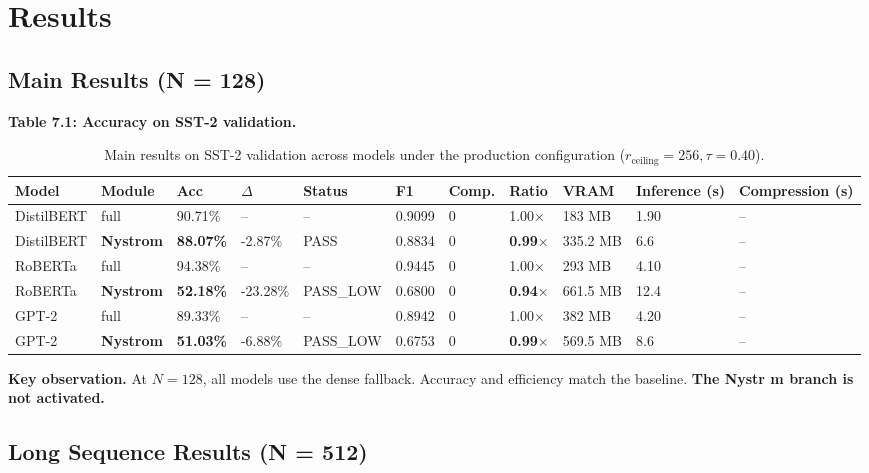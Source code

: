 
\section{Results}

\subsection{Main Results (N = 128)}

\textbf{Table 7.1: Accuracy on SST-2 validation.}

\begin{table}[t]
\centering
\small
\begin{tabular}{lllllllllll}
\toprule
\textbf{Model} & \textbf{Module} & \textbf{Acc} & \textbf{$\Delta$} & \textbf{Status} & \textbf{F1} & \textbf{Comp.} & \textbf{Ratio} & \textbf{VRAM} & \textbf{Inference (s)} & \textbf{Compression (s)} \\
\midrule
DistilBERT & full & 90.71\% & -- & -- & 0.9099 & 0 & 1.00$\times$ & 183 MB & 1.90 & -- \\
DistilBERT & \textbf{Nystrom} & \textbf{88.07\%} & -2.87\% & PASS & 0.8834 & 0 & \textbf{0.99$\times$} & 335.2 MB & 6.6 & -- \\
RoBERTa & full & 94.38\% & -- & -- & 0.9445 & 0 & 1.00$\times$ & 293 MB & 4.10 & -- \\
RoBERTa & \textbf{Nystrom} & \textbf{52.18\%} & -23.28\% & PASS\_LOW & 0.6800 & 0 & \textbf{0.94$\times$} & 661.5 MB & 12.4 & -- \\
GPT-2 & full & 89.33\% & -- & -- & 0.8942 & 0 & 1.00$\times$ & 382 MB & 4.20 & -- \\
GPT-2 & \textbf{Nystrom} & \textbf{51.03\%} & -6.88\% & PASS\_LOW & 0.6753 & 0 & \textbf{0.99$\times$} & 569.5 MB & 8.6 & -- \\
\bottomrule
\end{tabular}
\caption{Main results on SST-2 validation across models under the production configuration ($r_{\mathrm{ceiling}}=256, \tau=0.40$).}
\label{tab:main_sst2}
\end{table}

\textbf{Key observation.} At $N = 128$, all models use the dense fallback. Accuracy 
and efficiency match the baseline. \textbf{The Nystr m branch is not activated.}

\subsection{Long Sequence Results (N = 512)}

